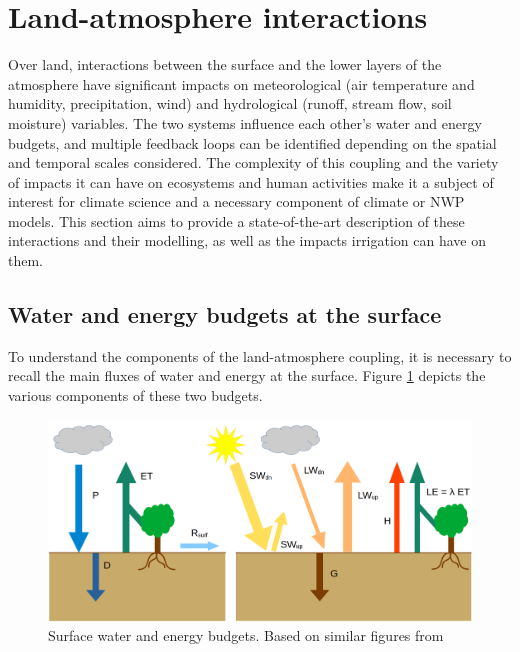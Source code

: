 \clearpage

\section{Land-atmosphere interactions}
\label{sec:l-a_interactions}

Over land, interactions between the surface and the lower layers of the atmosphere have significant impacts on meteorological (air temperature and humidity, precipitation, wind) and hydrological (runoff, stream flow, soil moisture) variables. The two systems influence each other's water and energy budgets, and multiple feedback loops can be identified depending on the spatial and temporal scales considered. The complexity of this coupling and the variety of impacts it can have on ecosystems and human activities make it a subject of interest for climate science and a necessary component of climate or NWP models. This section aims to provide a state-of-the-art description of these interactions and their modelling, as well as the impacts irrigation can have on them. 

\subsection{Water and energy budgets at the surface}
To understand the components of the land-atmosphere coupling, it is necessary to recall the main fluxes of water and energy at the surface. 
Figure \ref{fig:budgets} depicts the various components of these two budgets.

\begin{figure}[ht]
    \centering
    \includegraphics[width=\textwidth]{images/intro/budgets.png}
    \caption{Surface water and energy budgets. Based on similar figures from \citet{seneviratne_investigating_2010,lunel_interactions_2024}
    }
    \label{fig:budgets}
\end{figure}


